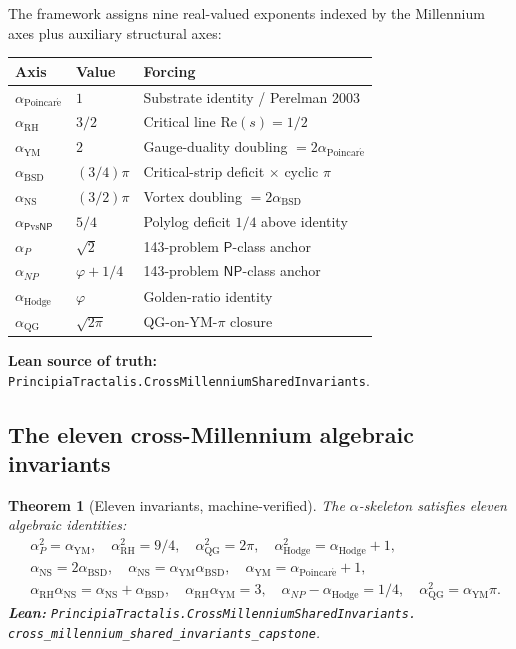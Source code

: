 \documentclass[11pt,a4paper]{article}
\theoremstyle{plain}
\newtheorem{theorem}{Theorem}[section]
\theoremstyle{definition}
\begin{document}
The framework assigns nine real-valued exponents indexed by the
Millennium axes plus auxiliary structural axes:

\begin{center}
\begin{tabular}{lll}
\toprule
\textbf{Axis} & \textbf{Value} & \textbf{Forcing} \\
\midrule
$\alpha_{\mathrm{Poincar\acute e}}$ & $1$ & Substrate identity / Perelman 2003 \\
$\alpha_{\mathrm{RH}}$ & $3/2$ & Critical line $\mathrm{Re}(s) = 1/2$ \\
$\alpha_{\mathrm{YM}}$ & $2$ & Gauge-duality doubling $= 2\alpha_{\mathrm{Poincar\acute e}}$ \\
$\alpha_{\mathrm{BSD}}$ & $(3/4)\pi$ & Critical-strip deficit $\times$ cyclic $\pi$ \\
$\alpha_{\mathrm{NS}}$ & $(3/2)\pi$ & Vortex doubling $= 2\alpha_{\mathrm{BSD}}$ \\
$\alpha_{\mathsf{P}\mathrm{vs}\mathsf{NP}}$ & $5/4$ & Polylog deficit $1/4$ above identity \\
$\alpha_{P}$ & $\sqrt{2}$ & 143-problem $\mathsf{P}$-class anchor \\
$\alpha_{NP}$ & $\varphi + 1/4$ & 143-problem $\mathsf{NP}$-class anchor \\
$\alpha_{\mathrm{Hodge}}$ & $\varphi$ & Golden-ratio identity \\
$\alpha_{\mathrm{QG}}$ & $\sqrt{2\pi}$ & QG-on-YM-$\pi$ closure \\
\bottomrule
\end{tabular}
\end{center}

\textbf{Lean source of truth:}
\texttt{PrincipiaTractalis.CrossMillenniumSharedInvariants}.

\subsection{The eleven cross-Millennium algebraic invariants}

\begin{theorem}[Eleven invariants, machine-verified]
\label{thm:invariants}
The $\alpha$-skeleton satisfies eleven algebraic identities:
\begin{align*}
&\alpha_{P}^{2} = \alpha_{\mathrm{YM}}, \quad
\alpha_{\mathrm{RH}}^{2} = 9/4, \quad
\alpha_{\mathrm{QG}}^{2} = 2\pi, \quad
\alpha_{\mathrm{Hodge}}^{2} = \alpha_{\mathrm{Hodge}} + 1, \\
&\alpha_{\mathrm{NS}} = 2 \alpha_{\mathrm{BSD}}, \quad
\alpha_{\mathrm{NS}} = \alpha_{\mathrm{YM}} \alpha_{\mathrm{BSD}}, \quad
\alpha_{\mathrm{YM}} = \alpha_{\mathrm{Poincar\acute e}} + 1, \\
&\alpha_{\mathrm{RH}} \alpha_{\mathrm{NS}} =
  \alpha_{\mathrm{NS}} + \alpha_{\mathrm{BSD}}, \quad
\alpha_{\mathrm{RH}} \alpha_{\mathrm{YM}} = 3, \quad
\alpha_{NP} - \alpha_{\mathrm{Hodge}} = 1/4, \quad
\alpha_{\mathrm{QG}}^{2} = \alpha_{\mathrm{YM}} \pi.
\end{align*}
\textbf{Lean:}
\texttt{PrincipiaTractalis.CrossMillenniumSharedInvariants.\\
cross\_millennium\_shared\_invariants\_capstone}.
\end{theorem}
\end{document}
